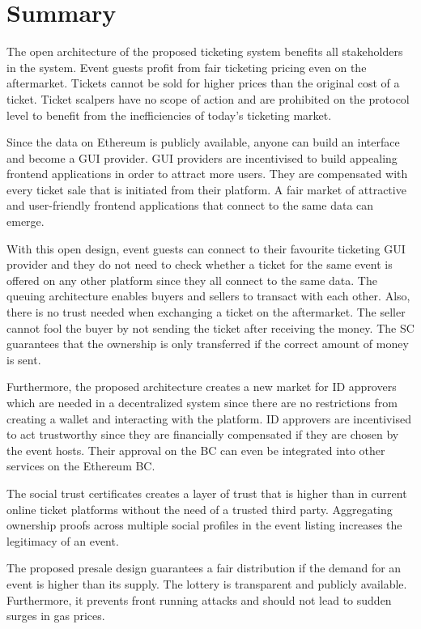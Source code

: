 \chapter{Summary}\label{chapter:summary}

The open architecture of the proposed ticketing system benefits all stakeholders in the system. Event guests profit from fair ticketing pricing even on the aftermarket. Tickets cannot be sold for higher prices than the original cost of a ticket. Ticket scalpers have no scope of action and are prohibited on the protocol level to benefit from the inefficiencies of today's ticketing market.

Since the data on Ethereum is publicly available, anyone can build an interface and become a GUI provider. GUI providers are incentivised to build appealing frontend applications in order to attract more users. They are compensated with every ticket sale that is initiated from their platform. A fair market of attractive and user-friendly frontend applications that connect to the same data can emerge.

With this open design, event guests can connect to their favourite ticketing GUI provider and they do not need to check whether a ticket for the same event is offered on any other platform since they all connect to the same data. The queuing architecture enables buyers and sellers to transact with each other. Also, there is no trust needed when exchanging a ticket on the aftermarket. The seller cannot fool the buyer by not sending the ticket after receiving the money. The SC guarantees that the ownership is only transferred if the correct amount of money is sent.

Furthermore, the proposed architecture creates a new market for ID approvers which are needed in a decentralized system since there are no restrictions from creating a wallet and interacting with the platform. ID approvers are incentivised to act trustworthy since they are financially compensated if they are chosen by the event hosts. Their approval on the BC can even be integrated into other services on the Ethereum BC. 

The social trust certificates creates a layer of trust that is higher than in current online ticket platforms without the need of a trusted third party. Aggregating ownership proofs across multiple social profiles in the event listing increases the legitimacy of an event. 

The proposed presale design guarantees a fair distribution if the demand for an event is higher than its supply. The lottery is transparent and publicly available. Furthermore, it prevents front running attacks and should not lead to sudden surges in gas prices.

